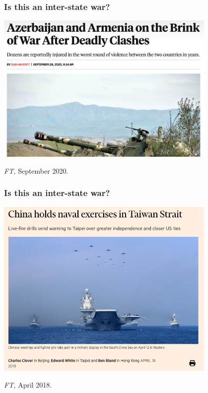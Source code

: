 \documentclass[aspectratio=43]{beamer}
\begin{document}
\begin{frame}
\frametitle{Is this an inter-state war?}
\centering

\includegraphics[width = 0.8\textwidth]{img/foreignaffairs_nagorno}

{\footnotesize \textit{FT,} September 2020.}

\end{frame}

\begin{frame}
\frametitle{Is this an inter-state war?}
\centering

\includegraphics[width = 0.8\textwidth]{img/ft_south_china_sea}

{\footnotesize \textit{FT,} April 2018.}

\end{frame}
\end{document}
